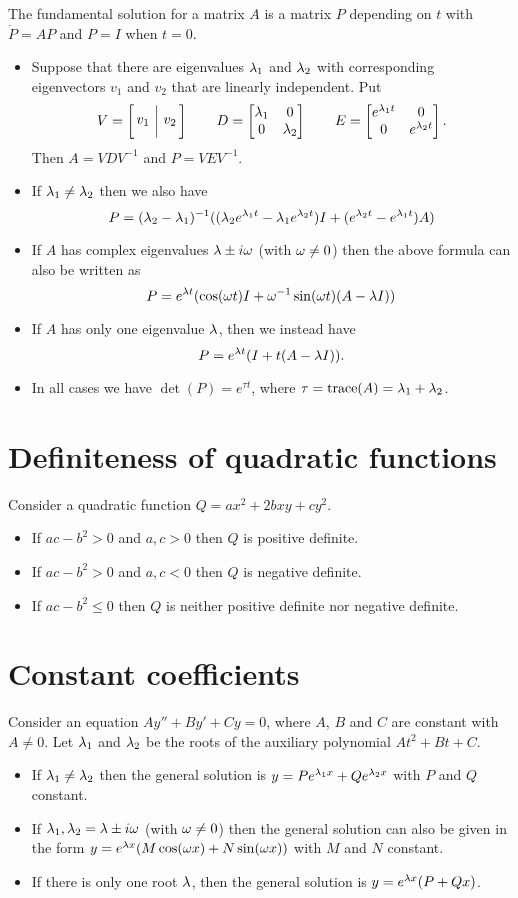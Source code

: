 \documentclass[reqno]{amsart}
\begin{document}
The fundamental solution for a matrix $A$ is a matrix $P$ depending on
$t$ with $\dot{P}=AP$ and $P=I$ when $t=0$.

\begin{itemize}
 \item Suppose that there are eigenvalues $\lambda_1$ and $\lambda_2$ with
  corresponding eigenvectors $v_1$ and $v_2$ that are linearly
  independent.  Put 
  \[ V = \barmat{v_1}{v_2} \qquad
     D = \bbm \lm_1 & 0 \\ 0 & \lm_2 \ebm \qquad 
     E = \bbm e^{\lm_1t} & 0 \\ 0 & e^{\lm_2t} \ebm.
  \]
  Then $A=VDV^{-1}$ and $P=VEV^{-1}$.
 \item If $\lambda_1\neq\lambda_2$ then we also have
  \[ P=(\lambda_2-\lambda_1)^{-1}((\lambda_2e^{\lambda_1t}-\lambda_1e^{\lambda_2t})I +
                        (e^{\lambda_2t}-e^{\lambda_1t})A)
  \]
 \item If $A$ has complex eigenvalues $\lambda\pm i\omega$ (with $\omega\neq 0$)
  then the above formula can also be written as 
  \[ P=e^{\lambda t}(\cos(\omega t)I+\omega^{-1}\sin(\omega t)(A-\lambda I)) \]
 \item If $A$ has only one eigenvalue $\lambda$, then we instead have
  \[ P = e^{\lambda t}(I + t(A-\lambda I)). \]
 \item In all cases we have $\det(P)=e^{\tau t}$, where
  $\tau=\operatorname{trace}(A)=\lambda_1+\lambda_2$. 
\end{itemize}

\section*{Definiteness of quadratic functions}

Consider a quadratic function $Q=ax^2+2bxy+cy^2$.
\begin{itemize}
  \item If $ac-b^2>0$ and $a,c>0$ then $Q$ is positive definite.
  \item If $ac-b^2>0$ and $a,c<0$ then $Q$ is negative definite.
  \item If $ac-b^2\leq 0$ then $Q$ is neither positive
   definite nor negative definite.
\end{itemize}

\section*{Constant coefficients}

Consider an equation $Ay''+By'+Cy=0$, where $A$, $B$ and $C$ are
constant with $A\neq 0$.  Let $\lambda_1$ and $\lambda_2$ be the roots of the
auxiliary polynomial $At^2+Bt+C$.
\begin{itemize}
 \item If $\lambda_1\neq\lambda_2$ then the general solution is
  $y=Pe^{\lambda_1x}+Qe^{\lambda_2x}$ with $P$ and $Q$ constant.
 \item If $\lambda_1,\lambda_2=\lambda\pm i\omega$ (with $\omega\neq 0$) then the
  general solution can also be given in the form $y=e^{\lambda
   x}(M\cos(\omega x)+N\sin(\omega x))$ with $M$ and $N$ constant.
 \item If there is only one root $\lambda$, then the general solution is
  $y=e^{\lambda x}(P+Qx)$.
\end{itemize}
\end{document}
